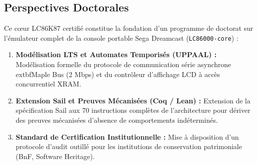 \documentclass[10pt,journal,compsoc]{IEEEtran}
\begin{document}
\subsection{Perspectives Doctorales}
Ce cœur LC86K87 certifié constitue la fondation d'un programme de doctorat sur l'émulateur complet de la console portable Sega Dreamcast (\texttt{LC86000-core}) :
\begin{enumerate}
    \item \textbf{Modélisation LTS et Automates Temporisés (UPPAAL) :} Modélisation formelle du protocole de communication série asynchrone 	extbf{Maple Bus} (2 Mbps) et du contrôleur d'affichage LCD à accès concurrentiel XRAM.
    \item \textbf{Extension Sail et Preuves Mécanisées (Coq / Lean) :} Extension de la spécification Sail aux 70 instructions complètes de l'architecture pour dériver des preuves mécanisées d'absence de comportements indéterminés.
    \item \textbf{Standard de Certification Institutionnelle :} Mise à disposition d'un protocole d'audit outillé pour les institutions de conservation patrimoniale (BnF, Software Heritage).
\end{enumerate}



\end{document}
